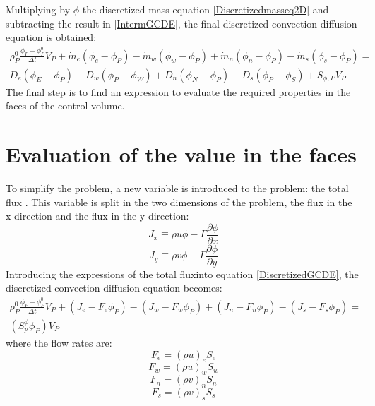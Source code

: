Multiplying by $\phi$ the discretized mass equation \ref{Discretizedmasseq2D} and subtracting the result in \ref{IntermGCDE}, the final discretized convection-diffusion equation is obtained:
\begin{multline}
\rho_{P}^{0}\frac{\phi_{P}-\phi_{P}^{0}}{\Delta t}V_{P}+\dot{m}_{e}\left(\phi_{e}-\phi_{P}\right)-\dot{m}_{w}\left(\phi_{w}-\phi_{P}\right)+\dot{m}_{n}\left(\phi_{n}-\phi_{P}\right)-\dot{m}_{s}\left(\phi_{s}-\phi_{P}\right)= \\
D_{e}\left(\phi_{E}-\phi_{P}\right)-D_{w}\left(\phi_{P}-\phi_{W}\right)+D_{n}\left(\phi_{N}-\phi_{P}\right)-D_{s}\left(\phi_{P}-\phi_{S}\right)+S_{\phi,P}V_{P}
\label{DiscretizedGCDE}
\end{multline}
The final step is to find an expression to evaluate the required properties in the faces of the control volume.

\section{Evaluation of the value in the faces}
To simplify the problem, a new variable is introduced to the problem: the total flux \cite{Patankar1980}. This variable is split in the two dimensions of the problem, the flux in the x-direction and the flux in the y-direction:
\begin{equation}
J_{x}\equiv\rho u\phi-\Gamma\frac{\partial\phi}{\partial x}
\end{equation}
\begin{equation}
J_{y}\equiv\rho v\phi-\Gamma\frac{\partial\phi}{\partial y}
\end{equation}
Introducing the expressions of the total fluxinto equation \ref{DiscretizedGCDE}, the discretized convection diffusion equation becomes:
\begin{multline}
\rho_{P}^{0}\frac{\phi_{P}-\phi_{P}^{0}}{\Delta t}V_{P}+\left(J_{e}-F_{e}\phi_{P}\right)-\left(J_{w}-F_{w}\phi_{P}\right)+\left(J_{n}-F_{n}\phi_{P}\right)-\left(J_{s}-F_{s}\phi_{P}\right)= \\
\left(S_{p}^{\phi}\phi_{P}\right)V_{P}
\label{FinalDiscrGCDE}
\end{multline}
where the flow rates are:
\begin{equation}
F_{e}=\left(\rho u\right)_{e}S_{e}
\end{equation}
\begin{equation}
F_{w}=\left(\rho u\right)_{w}S_{w}
\end{equation}
\begin{equation}
F_{n}=\left(\rho v\right)_{n}S_{n}
\end{equation}
\begin{equation}
F_{s}=\left(\rho v\right)_{s}S_{s}
\end{equation}

